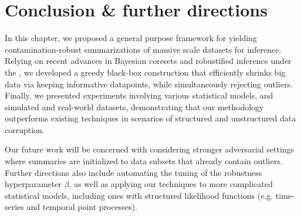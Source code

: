 \section{Conclusion \& further directions}
\label{sec:conclusion}
In this chapter, we proposed a general purpose framework for yielding  contamination-robust summarizations of massive scale datasets for inference. Relying on recent advances in Bayesian coresets and robustified inference under the \bdiv{}, we developed a greedy black-box construction that efficiently shrinks big data via keeping informative datapoints, while simultaneously rejecting outliers.
 Finally, we presented experiments involving various statistical models, and simulated and real-world datasets, demonstrating that our methodology outperforms existing techniques in scenarios of structured and unstructured data corruption. 

Our future work will be concerned with considering stronger adversarial settings where summaries are initialized to data subsets that already contain outliers. Further directions also include automating the tuning of the robustness hyperparameter $\beta$, as well as applying our techniques to more complicated statistical models, including ones with structured likelihood functions (e.g. time-series and temporal point processes).